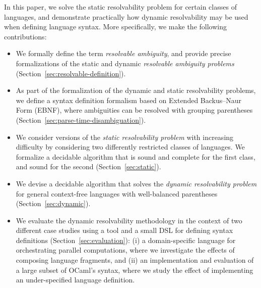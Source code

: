 \documentclass[runningheads]{llncs}
\begin{document}

In this paper, we solve the static resolvability problem for certain classes of languages, and demonstrate practically how dynamic resolvability may be used when defining language syntax. More specifically, we make the following contributions:

\begin{itemize}
\item We formally define the term \emph{resolvable ambiguity}, and
  provide precise formalizations of the static and dynamic
  \emph{resolvable ambiguity problems}
  (Section~\ref{sec:resolvable-definition}).
\item As part of the formalization of the dynamic and static resolvability problems, we define a syntax definition formalism based on Extended Backus–Naur Form (EBNF), where ambiguities can be resolved with grouping parentheses (Section~\ref{sec:parse-time-disambiguation}).
\item We consider versions of the \emph{static resolvability
    problem} with increasing difficulty by considering two
  differently restricted classes of languages. We formalize a
  decidable algorithm that is sound and complete for the first
  class, and sound for the second (Section~\ref{sec:static}).
\item We devise a decidable algorithm that solves the
  \emph{dynamic resolvability problem} for general context-free
  languages with well-balanced parentheses
  (Section~\ref{sec:dynamic}).
\item We evaluate the dynamic resolvability methodology in the context of two
  different case studies using a tool and a small DSL for defining
  syntax definitions (Section~\ref{sec:evaluation}): (i) a
  domain-specific language for orchestrating parallel
  computations, where we investigate the effects of composing
  language fragments, and (ii) an implementation and evaluation of
  a large subset of OCaml's syntax, where we study the effect of
  implementing an under-specified language definition.
\end{itemize}
\end{document}
